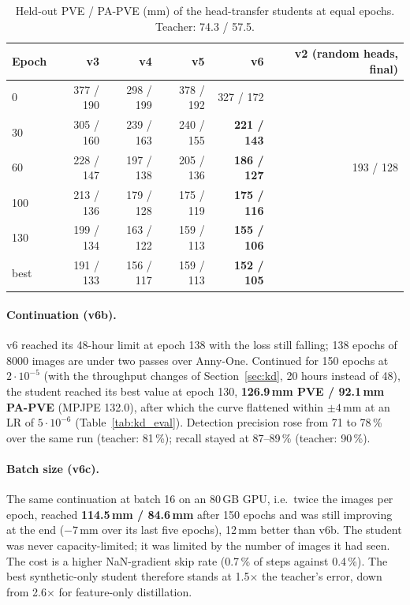 \begin{table}[h]
\centering\small
\begin{tabular}{lrrrrr}
\toprule
Epoch & v3 & v4 & v5 & v6 & v2 (random heads, final) \\
\midrule
0   & 377 / 190 & 298 / 199 & 378 / 192 & 327 / 172 & \\
30  & 305 / 160 & 239 / 163 & 240 / 155 & \textbf{221 / 143} & \\
60  & 228 / 147 & 197 / 138 & 205 / 136 & \textbf{186 / 127} & 193 / 128 \\
100 & 213 / 136 & 179 / 128 & 175 / 119 & \textbf{175 / 116} & \\
130 & 199 / 134 & 163 / 122 & 159 / 113 & \textbf{155 / 106} & \\
best & 191 / 133 & 156 / 117 & 159 / 113 & \textbf{152 / 105} & \\
\bottomrule
\end{tabular}
\caption{Held-out PVE / PA-PVE (mm) of the head-transfer students at equal
epochs. Teacher: 74.3 / 57.5.}
\label{tab:kd_epochs}
\end{table}

\paragraph{Continuation (v6b).} v6 reached its 48-hour limit at epoch 138
with the loss still falling; 138 epochs of 8000 images are under two passes
over Anny-One. Continued for 150 epochs at $2{\cdot}10^{-5}$ (with the
throughput changes of Section~\ref{sec:kd}, 20 hours instead of 48), the
student reached its best value at epoch 130, \textbf{126.9\,mm PVE / 92.1\,mm
PA-PVE} (MPJPE 132.0), after which the curve flattened within $\pm4$\,mm at an
LR of $5{\cdot}10^{-6}$ (Table~\ref{tab:kd_eval}). Detection precision rose
from 71 to 78\,\% over the same run (teacher: 81\,\%); recall stayed at
87--89\,\% (teacher: 90\,\%).

\paragraph{Batch size (v6c).} The same continuation at batch 16 on an 80\,GB
GPU, i.e.\ twice the images per epoch, reached \textbf{114.5\,mm / 84.6\,mm}
after 150 epochs and was still improving at the end ($-7$\,mm over its last
five epochs), 12\,mm better than v6b. The student was never
capacity-limited; it was limited by the number of images it had seen. The
cost is a higher NaN-gradient skip rate (0.7\,\% of steps against 0.4\,\%).
The best synthetic-only student therefore stands at 1.5$\times$ the
teacher's error, down from 2.6$\times$ for feature-only distillation.

